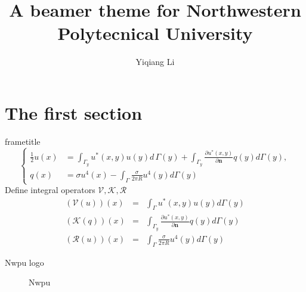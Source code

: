 \documentclass[xetex,10pt]{beamer}
\title[NPU theme]{A beamer theme for Northwestern Polytecnical University }
\author[Y. Li]{Yiqiang Li}
\institute[Dept. Applied Math.]{Department of Applied Mathmethics}
\begin{document}
\begin{frame}[t]
\titlepage
\end{frame}

\section{The first section}
\begin{frame}[t]{frametitle}
	\begin{equation}
		\left\{
		\begin{aligned}
			\frac{1}{2}u(x) &= \int_{\Gamma_y}u^*(x,y)u(y) d\,\Gamma (y) + \int_{\Gamma_y} \frac{\partial u^*(x,y)}{\partial \mathbf{n}} q(y) d \Gamma(y), \\
			q(x) &= \sigma u^4(x) - \int_\Gamma \frac{\sigma}{2 \pi R} u^4(y) d\Gamma(y)
		\end{aligned}
		\right.
	\end{equation}
	Define integral operators $\mathcal{V},\mathcal{K},\mathcal{R}$
		\begin{eqnarray*}
			(\mathcal{V}(u))(x) &=& \int_\Gamma u^*(x,y)u(y) d\Gamma(y) \\
			(\mathcal{K}(q))(x) &=& \int_{\Gamma_y} \frac{\partial u^*(x,y)}{\partial \mathbf{n}} q(y) d \Gamma(y) \\
			(\mathcal{R}(u))(x) &=& \int_\Gamma \frac{\sigma}{2 \pi R} u^4(y) d\Gamma(y)
		\end{eqnarray*}
\end{frame}
\begin{frame}[t]{Nwpu logo}
	\begin{figure}[htbp]
		\begin{center}
		\end{center}
		\caption{Nwpu}
		\label{fig:nwpu}
	\end{figure}
	
\end{frame}
\end{document}

